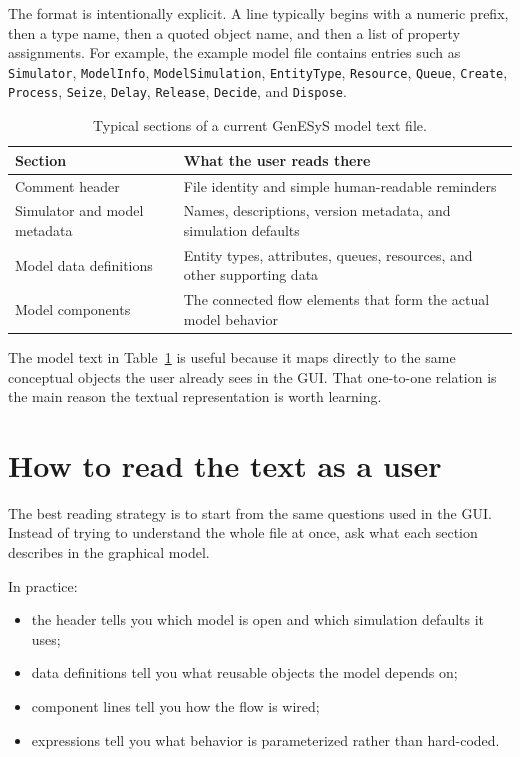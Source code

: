 The format is intentionally explicit. A line typically begins with a numeric
prefix, then a type name, then a quoted object name, and then a list of
property assignments. For example, the example model file contains entries such
as \texttt{Simulator}, \texttt{ModelInfo}, \texttt{ModelSimulation},
\texttt{EntityType}, \texttt{Resource}, \texttt{Queue}, \texttt{Create},
\texttt{Process}, \texttt{Seize}, \texttt{Delay}, \texttt{Release},
\texttt{Decide}, and \texttt{Dispose}.

\begin{table}[htbp]
\centering
\caption{Typical sections of a current GenESyS model text file.}
\label{tab:model-language-sections}
\small
\begin{tabular}{|p{3.5cm}|p{7.4cm}|}
\hline
\textbf{Section} & \textbf{What the user reads there} \\
\hline
Comment header & File identity and simple human-readable reminders \\
\hline
Simulator and model metadata & Names, descriptions, version metadata, and simulation defaults \\
\hline
Model data definitions & Entity types, attributes, queues, resources, and other supporting data \\
\hline
Model components & The connected flow elements that form the actual model behavior \\
\hline
\end{tabular}
\end{table}

The model text in Table~\ref{tab:model-language-sections} is useful because it
maps directly to the same conceptual objects the user already sees in the GUI.
That one-to-one relation is the main reason the textual representation is worth
learning.

\section{How to read the text as a user}
\label{sec:model-language-how-to-read}

The best reading strategy is to start from the same questions used in the GUI.
Instead of trying to understand the whole file at once, ask what each section
describes in the graphical model.

In practice:
\begin{itemize}
\item the header tells you which model is open and which simulation defaults it uses;
\item data definitions tell you what reusable objects the model depends on;
\item component lines tell you how the flow is wired;
\item expressions tell you what behavior is parameterized rather than hard-coded.
\end{itemize}

